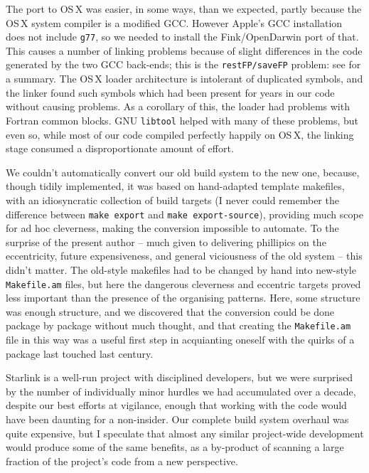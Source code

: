\documentclass{speauth}
\begin{document}
The port to OS\,X was easier, in some ways, than we expected, partly
because the OS\,X system compiler is a modified GCC.  However Apple's
GCC installation does not include \texttt{g77}, so we needed to
install the Fink/OpenDarwin port of that.  This causes a number of
linking problems because of slight differences in the code generated
by the two GCC back-ends; this is the \texttt{restFP/saveFP} problem:
see \cite{gray04} for a summary.  The OS\,X loader architecture is
intolerant of duplicated symbols, and the linker found such symbols
which had been present for years in our code without causing problems.
As a corollary of this, the loader had problems with Fortran common
blocks.  GNU \texttt{libtool} helped with many of these problems, but
even so, while most of our code compiled perfectly happily on OS\,X,
the linking stage consumed a disproportionate amount of effort.

We couldn't automatically convert our old build system to the new one,
because, though tidily implemented, it was based on hand-adapted
template makefiles, with an idiosyncratic collection of build targets
(I never could remember the difference between \texttt{make export}
and \texttt{make export-source}), providing much scope for ad hoc
cleverness, making the conversion impossible to automate.  To the
surprise of the present author -- much given to 
delivering phillipics on the eccentricity, future expensiveness, and
general viciousness of the old system -- this didn't matter.  The
old-style makefiles had to be changed by hand into new-style
\texttt{Makefile.am} files, but here the dangerous cleverness and
eccentric targets proved less important than the presence of the
organising patterns.  Here, some structure was enough structure, and
we discovered that the conversion could be done
package by package without much thought, and that creating the
\texttt{Makefile.am} file in this way was a useful first step in
acquianting oneself with the quirks of a package last touched last century.

Starlink is a well-run project with disciplined developers, but we
were surprised by the number of individually minor hurdles we had
accumulated over a decade, despite our best efforts at vigilance, enough that working with
the code would have been daunting for a non-insider.  Our complete
build system overhaul was quite expensive, but I speculate that almost
any similar project-wide development would produce some of the same
benefits, as a by-product of scanning a large fraction of the
project's code from a new perspective.
\end{document}
